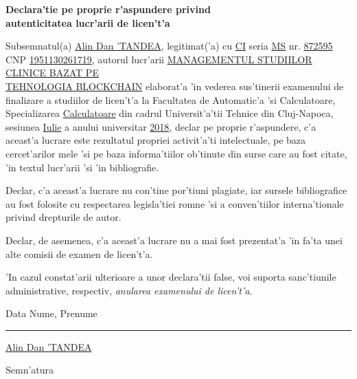 \documentclass[12pt,a4paper,twoside]{report}
\renewcommand{\thesisauthor}{Alin Dan 'TANDEA}    %
\newcommand{\uline}[1]{\rule[0pt]{#1}{0.4pt}}
\begin{document}
\vspace{0.5cm}

\begin{center}
{\bf
Declara'tie pe proprie r'aspundere privind\\ 
autenticitatea lucr'arii de licen't'a}
\end{center}
\vspace{1cm}



Subsemnatul(a)
\underline{\thesisauthor}, 
legitimat('a) cu \underline{CI} seria \underline{MS} nr. 
\underline{872595}
CNP \underline{1951130261719}, autorul lucr'arii \underline{MANAGEMENTUL STUDIILOR CLINICE BAZAT PE }\\\underline{TEHNOLOGIA BLOCKCHAIN}
elaborat'a 'in vederea sus'tinerii examenului de finalizare a studiilor de licen't'a la Facultatea de Automatic'a 'si Calculatoare, Specializarea \underline{Calculatoare} din cadrul Universit'a'tii Tehnice din Cluj-Napoca, sesiunea \underline{Iulie} a anului universitar \underline{2018}, declar pe proprie r'aspundere, c'a aceast'a lucrare este rezultatul propriei activit'a'ti intelectuale, pe baza cercet'arilor mele 'si pe baza informa'tiilor ob'tinute din surse care au fost citate, 'in textul lucr'arii 'si 'in bibliografie.

Declar, c'a aceast'a lucrare nu con'tine por'tiuni plagiate, iar sursele bibliografice au fost folosite cu respectarea legisla'tiei rom\ia ne 'si a conven'tiilor interna'tionale privind drepturile de autor.

Declar, de asemenea, c'a aceast'a lucrare nu a mai fost prezentat'a 'in fa'ta unei alte comisii de examen de licen't'a.

'In cazul constat'arii ulterioare a unor declara'tii false, voi suporta sanc'tiunile administrative, respectiv, \emph{anularea examenului de licen't'a}.

\vspace{1.5cm}

Data \hspace{8cm} Nume, Prenume

\vspace{0.5cm}

\uline{3cm} \hspace{5.9cm} \underline{\thesisauthor}

\vspace{1cm}
\hspace{9.4cm}Semn'atura

\thispagestyle{empty}
\end{document}
